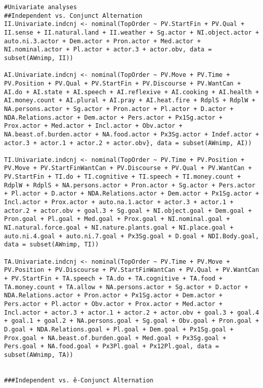 
\begin{lstlisting}[style=mystyle]
#Univariate analyses
##Independent vs. Conjunct Alternation
II.Univariate.indcnj <- nominal(TopOrder ~ PV.StartFin + PV.Qual + II.sense + II.natural.land + II.weather + Sg.actor + NI.object.actor + auto.ni.3.actor + Dem.actor + Pron.actor + Med.actor + NI.nominal.actor + Pl.actor + actor.3 + actor.obv, data = subset(AWnimp, II))

AI.Univariate.indcnj <- nominal(TopOrder ~ PV.Move + PV.Time + PV.Position + PV.Qual + PV.StartFin + PV.Discourse + PV.WantCan + AI.do + AI.state + AI.speech + AI.reflexive + AI.cooking + AI.health + AI.money.count + AI.plural + AI.pray + AI.heat.fire + RdplS + RdplW + NA.persons.actor + Sg.actor + Pron.actor + Pl.actor + D.actor + NDA.Relations.actor + Dem.actor + Pers.actor + Px1Sg.actor + Prox.actor + Med.actor + Incl.actor + Obv.actor + NA.beast.of.burden.actor + NA.food.actor + Px3Sg.actor + Indef.actor + actor.3 + actor.1 + actor.2 + actor.obv}, data = subset(AWnimp, AI))

TI.Univariate.indcnj <- nominal(TopOrder ~ PV.Time + PV.Position + PV.Move + PV.StartFinWantCan + PV.Discourse + PV.Qual + PV.WantCan + PV.StartFin + TI.do + TI.cognitive + TI.speech + TI.money.count + RdplW + RdplS + NA.persons.actor + Pron.actor + Sg.actor + Pers.actor + Pl.actor + D.actor + NDA.Relations.actor + Dem.actor + Px1Sg.actor + Incl.actor + Prox.actor + auto.na.1.actor + actor.3 + actor.1 + actor.2 + actor.obv + goal.3 + Sg.goal + NI.object.goal + Dem.goal + Pron.goal + Pl.goal + Med.goal + Prox.goal + NI.nominal.goal + NI.natural.force.goal + NI.nature.plants.goal + NI.place.goal + auto.ni.4.goal + auto.ni.7.goal + Px3Sg.goal + D.goal + NDI.Body.goal, data = subset(AWnimp, TI))

TA.Univariate.indcnj <- nominal(TopOrder ~ PV.Time + PV.Move + PV.Position + PV.Discourse + PV.StartFinWantCan + PV.Qual + PV.WantCan + PV.StartFin + TA.speech + TA.do + TA.cognitive + TA.food + TA.money.count + TA.allow + NA.persons.actor + Sg.actor + D.actor + NDA.Relations.actor + Pron.actor + Px1Sg.actor + Dem.actor + Pers.actor + Pl.actor + Obv.actor + Prox.actor + Med.actor + Incl.actor + actor.3 + actor.1 + actor.2 + actor.obv + goal.3 + goal.4 + goal.1 + goal.2 + NA.persons.goal + Sg.goal + Obv.goal + Pron.goal + D.goal + NDA.Relations.goal + Pl.goal + Dem.goal + Px1Sg.goal + Prox.goal + NA.beast.of.burden.goal + Med.goal + Px3Sg.goal + Pers.goal + NA.food.goal + Px3Pl.goal + Px12Pl.goal, data = subset(AWnimp, TA))


###Independent vs. ê-Conjunct Alternation


\end{lstlisting}
